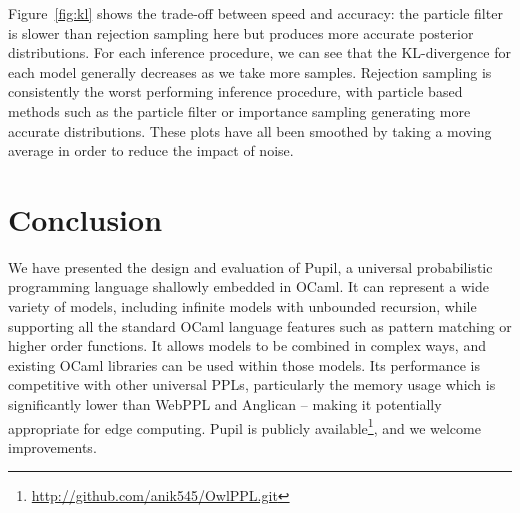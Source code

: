 \documentclass[sigconf]{acmart}
\newcommand{\pupil}{Pupil\xspace}
\begin{document}
Figure~\ref{fig:kl} shows the trade-off between speed and accuracy: the particle filter is slower than rejection sampling here but produces more accurate posterior distributions. For each inference procedure, we can see that the KL-divergence for each model generally decreases as we take more samples. Rejection sampling is consistently the worst performing inference procedure, with particle based methods such as the particle filter or importance sampling generating more accurate distributions. These plots have all been smoothed by taking a moving average in order to reduce the impact of noise.

\section{Conclusion}
\label{s:conclusion}

We have presented the design and evaluation of \pupil, a universal probabilistic programming language shallowly embedded in OCaml. It can represent a wide variety of models, including infinite models with unbounded recursion, while supporting all the standard OCaml language features such as pattern matching or higher order functions. It allows models to be combined in complex ways, and existing OCaml libraries can be used within those models. Its performance is competitive with other universal PPLs, particularly the memory usage which is significantly lower than WebPPL and Anglican -- making it potentially appropriate for edge computing. \pupil is publicly available\footnote{\url{http://github.com/anik545/OwlPPL.git}}, and we welcome improvements.


{
  \clearpage
  
  
}

\appendix
\end{document}
